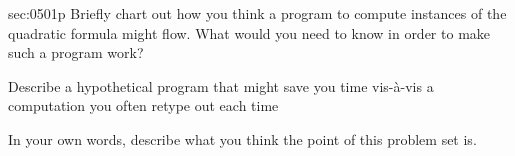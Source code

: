 \begin{multicols*}{2}
\begin{exercises}{sec:0501p}
\vspace{2cm}
\lab{} Briefly chart out how you think a program to compute instances of the quadratic formula might flow.  What would you need to know in order to make such a program work?

\vspace{2cm}
\lab{} Describe a hypothetical program that might save you time vis-à-vis a computation you often retype out each time

\vspace{2cm}
\lab{} In your own words, describe what you think the point of this problem set is.

\end{exercises}
\end{multicols*}